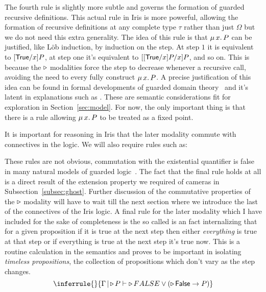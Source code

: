 \documentclass{amsart}
\newcommand{\provesJ}[3]{#1 \mathop{\vert} #2 \proves #3}
\newcommand{\provesIffJ}[3]{#1 \mathop{\vert} #2 \provesIff #3}
\begin{document}
The fourth rule is slightly more subtle and governs the formation of
guarded recursive definitions. This actual rule in Iris is more
powerful, allowing the formation of recursive definitions at any
complete type $\tau$ rather than just $\Omega$ but we do not need this
extra generality. The idea of this rule is that $\MU x. P$ can be
justified, like L\"ob induction, by induction on the step. At step $1$
it is equivalent to $[\textsf{True}/x]P$, at step one it's equivalent to
$[[\textsf{True}/x]P/x]P$, and so on. This is because the $\mathop{{\triangleright}}$ modalities
force the step to decrease whenever a recursive call, avoiding the
need to every fully construct $\MU x. P$. A precise justification of
this idea can be found in formal developments of guarded domain
theory~\citep{Birkedal:10,Birkedal:11} and it's latent in explanations
such as \citet{America:89}. These are semantic considerations fit for
exploration in Section~\ref{sec:model}. For now, the only important
thing is that there is a rule allowing $\MU x. P$ to be treated as a
fixed point.

It is important for reasoning in Iris that the later modality commute
with connectives in the logic. We will also require rules such as:
These rules are not obvious, commutation with the existential
quantifier is false in many natural models of guarded
logic~\citep{Gianantonio:02,Gianantonio:04,Birkedal:11,Svendsen:16}. The fact that
the final rule holds at all is a direct result of the extension
property we required of cameras in
Subsection~\ref{subsec:ghost}. Further discussion of the commutative
properties of the $\mathop{{\triangleright}}$ modality will have to wait till the next
section where we introduce the last of the connectives of the Iris
logic. A final rule for the later modality which I have included for
the sake of completeness is the so called is an fact internalizing
that for a given proposition if it is true at the next step then
either \emph{everything} is true at that step or if everything is true
at the next step it's true now. This is a routine calculation in the
semantics and proves to be important in isolating \emph{timeless
  propositions}, the collection of propositions which don't vary as
the step changes.
\[
  \inferrule{ }{
    \provesJ{\Gamma}{\later P}{\later FALSE \lor (\later \FALSE \to P)}
  }
\]
\end{document}
